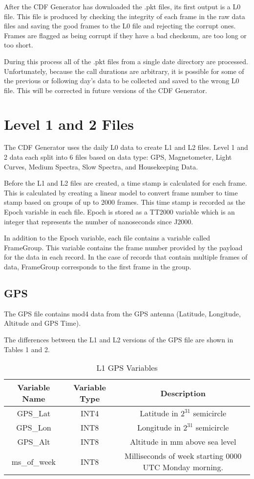 \documentclass{article}
\begin{document}
After the CDF Generator has downloaded the .pkt files, its first output is a L0 file. This file is produced by checking the integrity of each frame in the raw data files and saving the good frames to the L0 file and rejecting the corrupt ones. Frames are flagged as being corrupt if they have a bad checksum, are too long or too short. 

During this process all of the .pkt files from a single date directory are processed. Unfortunately, because the call durations are arbitrary, it is possible for some of the previous or following day's data to be collected and saved to the wrong L0 file. This will be corrected in future versions of the CDF Generator.


\section{Level 1 and 2 Files}
The CDF Generator uses the daily L0 data to create L1 and L2 files. Level 1 and 2 data each split into 6 files based on data type: GPS, Magnetometer, Light Curves, Medium Spectra, Slow Spectra, and Housekeeping Data.

Before the L1 and L2 files are created, a time stamp is calculated for each frame. This is calculated by creating a linear model to convert frame number to time stamp based on groups of up to 2000 frames. This time stamp is recorded as the Epoch variable in each file. Epoch is stored as a TT2000 variable which is an integer that represents the number of nanoseconds since J2000.

In addition to the Epoch variable, each file contains a variable called FrameGroup. This variable contains the frame number provided by the payload for the data in each record. In the case of records that contain multiple frames of data, FrameGroup corresponds to the first frame in the group.

\subsection{GPS}
The GPS file contains mod4 data from the GPS antenna (Latitude, Longitude, Altitude and GPS Time). 

The differences between the L1 and L2 versions of the GPS file are shown in Tables 1 and 2.

\begin{table}[H]
\caption{L1 GPS Variables}
\begin{tabular}{|c|c|c|}
\hline
Variable Name&Variable Type&Description\\ \hline
GPS\_Lat&INT4&Latitude in $2^{31}$ semicircle\\
GPS\_Lon&INT8&Longitude in $2^{31}$ semicircle\\
GPS\_Alt&INT8&Altitude in mm above sea level\\
ms\_of\_week&INT8 & Milliseconds of week starting 0000 UTC Monday morning.\\
\hline
\end{tabular}
\end{table}
\end{document}
